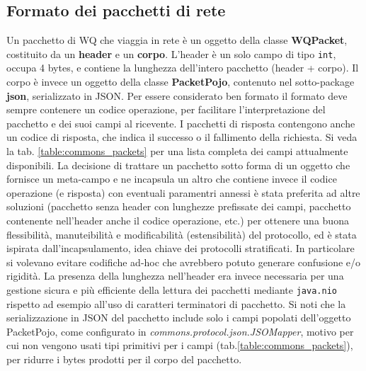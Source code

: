 \documentclass{article}
\begin{document}
    \subsection{Formato dei pacchetti di rete}\label{protocol_network}
    Un pacchetto di WQ che viaggia in rete è un oggetto della classe \textbf{WQPacket}, costituito da un \textbf{header} e un \textbf{corpo}. L'header è un solo campo di tipo \texttt{int}, occupa 4 bytes, e contiene la lunghezza dell'intero pacchetto (header + corpo).
    Il corpo è invece un oggetto della classe \textbf{PacketPojo}, contenuto nel sotto-package \textbf{json}, serializzato in JSON. Per essere considerato ben formato il formato deve sempre contenere un codice operazione, per facilitare l'interpretazione del pacchetto e dei suoi campi al ricevente. I pacchetti di risposta contengono anche un codice di risposta, che indica il successo o il fallimento della richiesta. Si veda la tab. \ref{table:commons_packets} per una lista completa dei campi attualmente disponibili.
    \newline La decisione di trattare un pacchetto sotto forma di un oggetto che fornisce un meta-campo e ne incapsula un altro che contiene invece il codice operazione (e risposta) con eventuali paramentri annessi è stata preferita ad altre soluzioni (pacchetto senza header con lunghezze prefissate dei campi, pacchetto contenente nell'header anche il codice operazione, etc.) per ottenere una buona flessibilità, manuteibilità e modificabilità (estensibilità) del protocollo, ed è stata ispirata dall'incapsulamento, idea chiave dei protocolli stratificati. In particolare si volevano evitare codifiche ad-hoc che avrebbero potuto generare confusione e/o rigidità. La presenza della lunghezza nell'header era invece necessaria per una gestione sicura e più efficiente della lettura dei pacchetti mediante \texttt{java.nio} rispetto ad esempio all'uso di caratteri terminatori di pacchetto.
    \newline Si noti che la serializzazione in JSON del pacchetto include solo i campi popolati dell'oggetto PacketPojo, come configurato in \textit{commons.protocol.json.JSOMapper}, motivo per cui non vengono usati tipi primitivi per i campi (tab.\ref{table:commons_packets}), per ridurre i bytes prodotti per il corpo del pacchetto.
\end{document}
